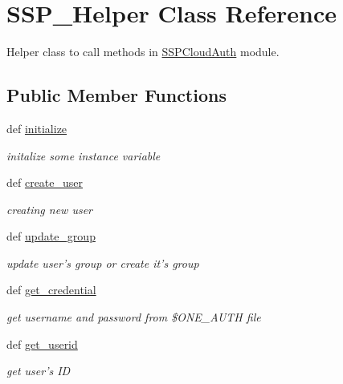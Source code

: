 \hypertarget{classSSP__Helper}{
\section{\-S\-S\-P\_\-\-H\-e\-l\-p\-e\-r \-C\-l\-a\-s\-s \-R\-e\-f\-e\-r\-e\-n\-c\-e}
\label{classSSP__Helper}
}


Helper class to call methods in \hyperlink{namespaceSSPCloudAuth}{\-S\-S\-P\-C\-l\-o\-u\-d\-A\-u\-t\-h} module.  


\subsection*{Public Member Functions}
\begin{DoxyCompactItemize}
\item 
\-d\-e\-f \hyperlink{classSSP__Helper_ab908821d6ce3055ada3983a8351dd08e}{\-i\-n\-i\-t\-i\-a\-l\-i\-z\-e}
\begin{DoxyCompactList}\small\item\em initalize some instance variable \end{DoxyCompactList}\item 
\-d\-e\-f \hyperlink{classSSP__Helper_af8371cbe8a7fe0ff2caf12a6e8cdee52}{\-c\-r\-e\-a\-t\-e\_\-\-u\-s\-e\-r}
\begin{DoxyCompactList}\small\item\em creating new user \end{DoxyCompactList}\item 
\-d\-e\-f \hyperlink{classSSP__Helper_a0da2857b0ce07d6fff802ac4f0ae2d57}{\-u\-p\-d\-a\-t\-e\_\-\-g\-r\-o\-u\-p}
\begin{DoxyCompactList}\small\item\em update user's group or create it's group \end{DoxyCompactList}\item 
\-d\-e\-f \hyperlink{classSSP__Helper_a6f6cfdeb2e1d3a683bfec4dacdfce6a0}{\-g\-e\-t\_\-\-c\-r\-e\-d\-e\-n\-t\-i\-a\-l}
\begin{DoxyCompactList}\small\item\em get username and password from \$\-O\-N\-E\_\-\-A\-U\-T\-H file \end{DoxyCompactList}\item 
\-d\-e\-f \hyperlink{classSSP__Helper_a5cda10befd53265f17243d252f0e0af7}{\-g\-e\-t\_\-\-u\-s\-e\-r\-i\-d}
\begin{DoxyCompactList}\small\item\em get user's ID \end{DoxyCompactList}\item 

\end{DoxyCompactItemize}
